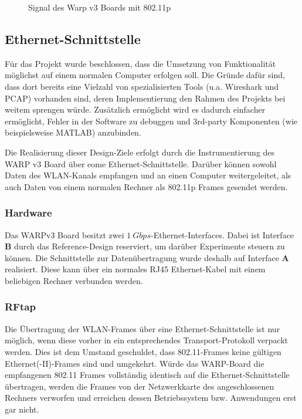 \documentclass[letterpaper,11pt,ngerman]{article}
\begin{document}
\begin{onehalfspace}
\begin{figure}[H]
\begin{center}
\caption{Signal des Warp v3 Boards mit 802.11p}
\label{fig7}
\end{center}
\end{figure}


\subsection{Ethernet-Schnittstelle}\label{ethernet-schnittstelle}

Für das Projekt wurde beschlossen, dass die Umsetzung von Funktionalität
möglichst auf einem normalen Computer erfolgen soll. Die Gründe dafür
sind, dass dort bereits eine Vielzahl von spezialisierten Tools (u.a.
Wireshark und PCAP) vorhanden sind, deren Implementierung den Rahmen des
Projekts bei weitem sprengen würde. Zusätzlich ermöglicht wird es
dadurch einfacher ermöglicht, Fehler in der Software zu debuggen und
3rd-party Komponenten (wie beispielsweise MATLAB) anzubinden.

Die Realisierung dieser Design-Ziele erfolgt durch die Instrumentierung
des WARP v3 Board über eome Ethernet-Schnittstelle. Darüber können
sowohl Daten des WLAN-Kanals empfangen und an einen Computer
weitergeleitet, als auch Daten von einem normalen Rechner als 802.11p
Frames gesendet werden.

\subsubsection{Hardware}\label{hardware}

Das WARPv3 Board besitzt zwei \(\SI{1}{Gbps}\)-Ethernet-Interfaces.
Dabei ist Interface \textbf{B} durch das Reference-Design reserviert, um
darüber Experimente steuern zu können\autocite{warp-exp}. Die
Schnittstelle zur Datenübertragung wurde deshalb auf Interface
\textbf{A} realisiert. Diese kann über ein normales RJ45 Ethernet-Kabel
mit einem beliebigen Rechner verbunden werden.

\subsubsection{RFtap}\label{rftap}

Die Übertragung der WLAN-Frames über eine Ethernet-Schnittstelle ist nur
möglich, wenn diese vorher in ein entsprechendes Transport-Protokoll
verpackt werden. Dies ist dem Umstand geschuldet, dass 802.11-Frames
keine gültigen Ethernet(-II)-Frames sind und umgekehrt. Würde das
WARP-Board die empfangenen 802.11 Frames vollständig identisch auf die
Ethernet-Schnittstelle übertragen, werden die Frames von der
Netzwerkkarte des angeschlossenen Rechners verworfen und erreichen
dessen Betriebssystem bzw. Anwendungen erst gar nicht.


\end{onehalfspace}
\end{document}
